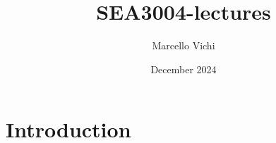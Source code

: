 \documentclass{article}
\title{SEA3004-lectures}
\author{Marcello Vichi}
\date{December 2024}
\begin{document}
\maketitle

\section{Introduction}
\end{document}
